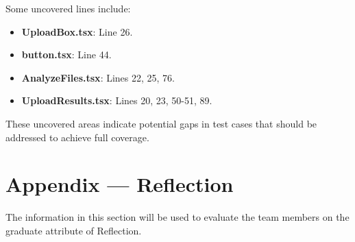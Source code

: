 \documentclass[12pt, titlepage]{article}
\begin{document}
Some uncovered lines include:

\begin{itemize}
\item \textbf{UploadBox.tsx}: Line 26.
\item \textbf{button.tsx}: Line 44.
\item \textbf{AnalyzeFiles.tsx}: Lines 22, 25, 76.
\item \textbf{UploadResults.tsx}: Lines 20, 23, 50-51, 89.
\end{itemize}

These uncovered areas indicate potential gaps in test cases that should be addressed to achieve full coverage.




\newpage{}
\section*{Appendix --- Reflection}

The information in this section will be used to evaluate the team members on the
graduate attribute of Reflection.


\end{document}
